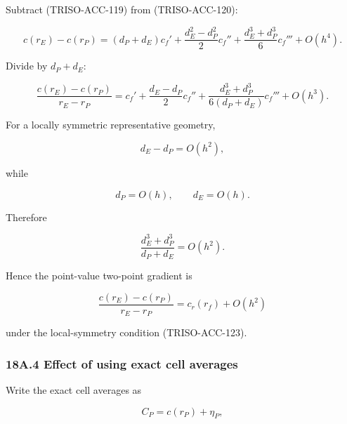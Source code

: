 \documentclass[11pt,a4paper]{article}
\begin{document}
Subtract (TRISO-ACC-119) from (TRISO-ACC-120):

\begin{equation}
c(r_E)-c(r_P)
=
(d_P+d_E)c_f'
+
\frac{d_E^2-d_P^2}{2}c_f''
+
\frac{d_E^3+d_P^3}{6}c_f'''
+
O(h^4).
\tag{TRISO-ACC-121}
\label{eq:triso-acc-121}
\end{equation}

Divide by $d_P+d_E$:

\begin{equation}
\frac{c(r_E)-c(r_P)}{r_E-r_P}
=
c_f'
+
\frac{d_E-d_P}{2}c_f''
+
\frac{d_E^3+d_P^3}{6(d_P+d_E)}c_f'''
+
O(h^3).
\tag{TRISO-ACC-122}
\label{eq:triso-acc-122}
\end{equation}

For a locally symmetric representative geometry,

\begin{equation}
d_E-d_P=O(h^2),
\tag{TRISO-ACC-123}
\label{eq:triso-acc-123}
\end{equation}

while

\begin{equation}
d_P=O(h),
\qquad
d_E=O(h).
\tag{TRISO-ACC-124}
\label{eq:triso-acc-124}
\end{equation}

Therefore

\begin{equation}
\frac{d_E^3+d_P^3}{d_P+d_E}
=
O(h^2).
\tag{TRISO-ACC-125}
\label{eq:triso-acc-125}
\end{equation}

Hence the point-value two-point gradient is

\begin{equation}
\boxed{
\frac{c(r_E)-c(r_P)}{r_E-r_P}
=
c_r(r_f)
+
O(h^2)
}
\tag{TRISO-ACC-126}
\label{eq:triso-acc-126}
\end{equation}

under the local-symmetry condition (TRISO-ACC-123).

\subsubsection*{18A.4 Effect of using exact cell averages}

Write the exact cell averages as

\begin{equation}
C_P=c(r_P)+\eta_P,
\tag{TRISO-ACC-127}
\label{eq:triso-acc-127}
\end{equation}
\end{document}
